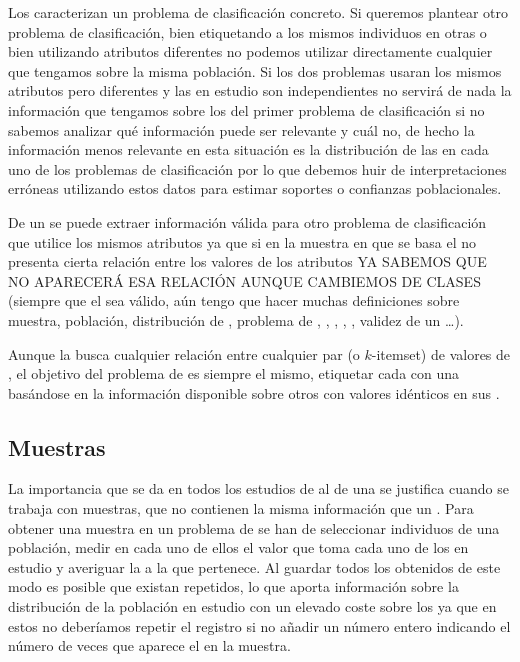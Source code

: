 Los \catalogoss caracterizan un problema de clasificación concreto. Si queremos plantear otro problema de clasificación, bien etiquetando a los mismos individuos en otras \clases o bien utilizando atributos diferentes no podemos utilizar directamente cualquier \catalogos que tengamos sobre la misma población. Si los dos problemas usaran los mismos atributos pero diferentes \clases y las \clases en estudio son independientes no servirá de nada la información que tengamos sobre los \sCCs del primer problema de clasificación si no sabemos analizar qué información puede ser relevante y cuál no, de hecho la información menos relevante en esta situación es la distribución de las \clases en cada uno de los problemas de clasificación por lo que debemos huir de interpretaciones erróneas utilizando estos datos para estimar soportes o confianzas poblacionales.

De un \catalogos se puede extraer información válida para otro problema de clasificación que utilice los mismos atributos ya que si en la muestra en que se basa el \catalogos no presenta cierta relación entre los valores de los atributos YA SABEMOS QUE NO APARECERÁ ESA RELACIÓN AUNQUE CAMBIEMOS DE CLASES (siempre que el \catalogos sea válido, aún tengo que hacer muchas definiciones sobre muestra, población, distribución de \clases, problema de \clasificacion, \atributos, \clases, \catalogos, \sCCs, validez de un \catalogos\ldots).

Aunque la \ARM busca cualquier relación entre cualquier par (o $k$-itemset) de valores de \D, el objetivo del problema de \clasificacion es siempre el mismo, etiquetar cada \registro con una \clase basándose en la información disponible sobre otros \registros con valores idénticos en sus \atributos.





\subsection{Muestras}
\label{sec:clasificacion:catalogo:muestras}
La importancia que se da en todos los estudios de \ARM al \soporte de una \ar se justifica cuando se trabaja con muestras, que no contienen la misma información que un \catalogo. Para obtener una muestra en un problema de \clasificacion se han de seleccionar individuos de una población, medir en cada uno de ellos el valor que toma cada uno de los \atributos en estudio y averiguar la \clase a la que pertenece. Al guardar todos los \registros obtenidos de este modo es posible que existan \registros repetidos, lo que aporta información sobre la distribución de la población en estudio con un elevado coste sobre los \catalogos ya que en estos no deberíamos repetir el registro si no añadir un número entero indicando el número de veces que aparece el \registro en la muestra.

